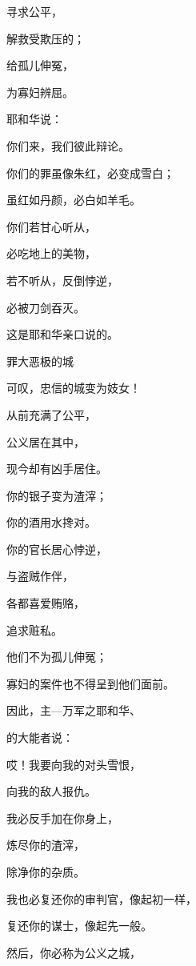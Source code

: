{\par }{\Q 寻求公平，
\par }{\Q 解救受欺压的；
\par }{\Q 给孤儿伸冤，
\par }{\Q 为寡妇辨屈。
\par }{\BB \par }{\Q {}耶和华说：
\par }{\Q 你们来，我们彼此辩论。
\par }{\Q 你们的罪虽像朱红，必变成雪白；
\par }{\Q 虽红如丹颜，必白如羊毛。
\par }{\Q {}你们若甘心听从，
\par }{\Q 必吃地上的美物，
\par }{\Q {}若不听从，反倒悖逆，
\par }{\Q 必被刀剑吞灭。
\par }{\Q 这是耶和华亲口说的。
\par }{\SH 罪大恶极的城
\par }{\Q {}可叹，忠信的城变为妓女！
\par }{\Q 从前充满了公平，
\par }{\Q 公义居在其中，
\par }{\Q 现今却有凶手居住。
\par }{\Q {}你的银子变为渣滓；
\par }{\Q 你的酒用水搀对。
\par }{\Q {}你的官长居心悖逆，
\par }{\Q 与盗贼作伴，
\par }{\Q 各都喜爱贿赂，
\par }{\Q 追求赃私。
\par }{\Q 他们不为孤儿伸冤；
\par }{\Q 寡妇的案件也不得呈到他们面前。
\par }{\BB \par }{\Q {}因此，主—万军之耶和华、
\par }{的大能者说：
\par }{\Q 哎！我要向我的对头雪恨，
\par }{\Q 向我的敌人报仇。
\par }{\Q {}我必反手加在你身上，
\par }{\Q 炼尽你的渣滓，
\par }{\Q 除净你的杂质。
\par }{\Q {}我也必复还你的审判官，像起初一样，
\par }{\Q 复还你的谋士，像起先一般。
\par }{\Q 然后，你必称为公义之城，
}
